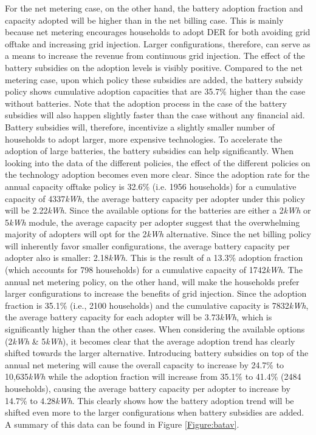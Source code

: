 \noindent
For the net metering case, on the other hand, the battery adoption fraction and capacity adopted will be higher than in the net billing case. This is mainly because net metering encourages households to adopt DER for both avoiding grid offtake and increasing grid injection. Larger configurations, therefore, can serve as a means to increase the revenue from continuous grid injection. 
\newline \newline \noindent
The effect of the battery subsidies on the adoption levels is visibly positive. Compared to the net metering case, upon which policy these subsidies are added, the battery subsidy policy shows cumulative adoption capacities that are 35.7\% higher than the case without batteries. Note that the adoption process in the case of the battery subsidies will also happen slightly faster than the case without any financial aid. Battery subsidies will, therefore, incentivize a slightly smaller number of households to adopt larger, more expensive technologies. To accelerate the adoption of large batteries, the battery subsidies can help significantly. When looking into the data of the different policies, the effect of the different policies on the technology adoption becomes even more clear. Since the adoption rate for the annual capacity offtake policy is 32.6\% (i.e. 1956 households) for a cumulative capacity of 4337\textit{kWh}, the average battery capacity per adopter under this policy will be 2.22\textit{kWh}. Since the available options for the batteries are either a 2\textit{kWh} or 5\textit{kWh} module, the average capacity per adopter suggest that the overwhelming majority of adopters will opt for the 2\textit{kWh} alternative.	Since the net billing policy will inherently favor smaller configurations, the average battery capacity per adopter also is smaller: 2.18\textit{kWh}. This is the result of a 13.3\% adoption fraction (which accounts for 798 households) for a cumulative capacity of 1742\textit{kWh}. The annual net metering policy, on the other hand, will make the households prefer larger configurations to increase the benefits of grid injection. Since the adoption fraction is 35.1\% (i.e., 2100 households) and the cumulative capacity is 7832\textit{kWh}, the average battery capacity for each adopter will be 3.73\textit{kWh}, which is significantly higher than the other cases. When considering the available options (2\textit{kWh} \& 5\textit{kWh}), it becomes clear that the average adoption trend has clearly shifted towards the larger alternative. Introducing battery subsidies on top of the annual net metering will cause the overall capacity to increase by 24.7\% to 10,635\textit{kWh} while the adoption fraction will increase from 35.1\% to 41.4\% (2484 households), causing the average battery capacity per adopter to increase by 14.7\% to 4.28\textit{kWh}. This clearly shows how the battery adoption trend will be shifted even more to the larger configurations when battery subsidies are added. A summary of this data can be found in Figure \ref{Figure:batav}.
